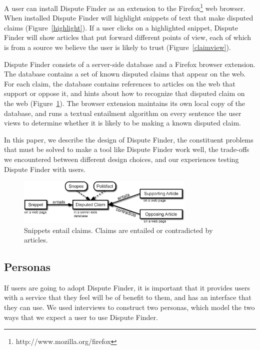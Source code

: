 \documentclass{www2010-submission}
\newcommand{\todo}[1]{}
\begin{document}
A user can install Dispute Finder as an extension to the Firefox\footnote{http://www.mozilla.org/firefox} web browser. When installed Dispute Finder will highlight snippets of text that make disputed claims (Figure~\ref{highlight}). 
If a user clicks on a highlighted snippet, Dispute Finder will show articles that put forward different points of view,  each of which is from a source we believe the user is likely to trust (Figure~\ref{claimview}). 

Dispute Finder consists of a server-side database and a Firefox browser extension. The database contains a set of known disputed claims that appear on the web. For each claim, the database contains references to articles on the web that support or oppose it, and hints about how to recognize that disputed claim on the web (Figure~\ref{snippet_claim_article}). The browser extension maintains its own local copy of the database, and runs a textual entailment algorithm on every sentence the user views to determine whether it is likely to be making a known disputed claim. 

\todo{Should we mention the API? Cut from this version as tangential}

In this paper, we describe the design of Dispute Finder, the constituent problems that must be solved to make a tool like Dispute Finder work well, the trade-offs we encountered between different design choices, and our experiences testing Dispute Finder with users.

\begin{figure}[tb]
	\begin{center}
	\includegraphics[width=8.5cm]{pictures/snippet_claim_article_fancy3.png}
	\caption{Snippets entail claims. Claims are entailed or contradicted by articles.}
	\label{snippet_claim_article}
	\end{center}
\end{figure}

\subsection{Personas}

If users are going to adopt Dispute Finder, it is important that it provides users with a service that they feel will be of benefit to them, and has an interface that they can use. We used interviews to construct two personas, which model the two ways that we expect a user to use Dispute Finder.
\end{document}
